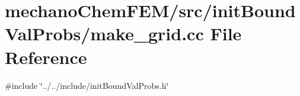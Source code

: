 \section{mechano\+Chem\+F\+E\+M/src/init\+Bound\+Val\+Probs/make\+\_\+grid.cc File Reference}
\label{make__grid_8cc}
{\ttfamily \#include \char`\"{}../../include/init\+Bound\+Val\+Probs.\+h\char`\"{}}\newline
